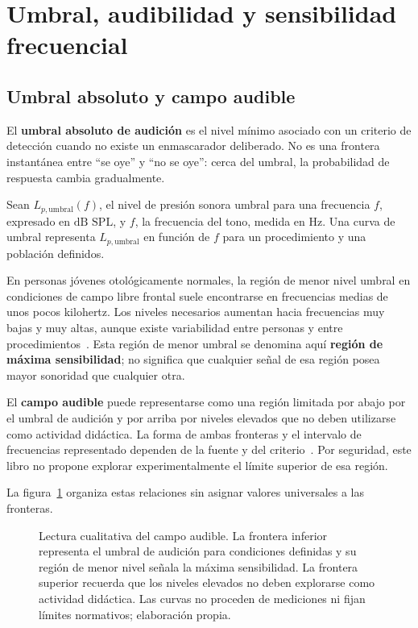 \section{Umbral, audibilidad y sensibilidad frecuencial}
\label{sec:u7-umbral-audibilidad}

\subsection{Umbral absoluto y campo audible}
\label{sec:u7-umbral-absoluto}

El \textbf{umbral absoluto de audición} es el nivel mínimo asociado con un
criterio de detección cuando no existe un enmascarador deliberado. No es una
frontera instantánea entre ``se oye'' y ``no se oye'': cerca del umbral, la
probabilidad de respuesta cambia gradualmente.

Sean \(L_{p,\mathrm{umbral}}(f)\), el nivel de presión sonora umbral para una
frecuencia \(f\), expresado en \(\text{dB SPL}\), y \(f\), la frecuencia del
tono, medida en \(\text{Hz}\). Una curva de umbral representa
\(L_{p,\mathrm{umbral}}\) en función de \(f\) para un procedimiento y una
población definidos.

En personas jóvenes otológicamente normales, la región de menor nivel
umbral en condiciones de campo libre frontal suele encontrarse en frecuencias
medias de unos pocos kilohertz. Los niveles necesarios aumentan hacia
frecuencias muy bajas y muy altas, aunque existe variabilidad entre personas y
entre procedimientos~\cite{iso226_2023,oxenham2018}. Esta región de menor umbral se denomina aquí
\textbf{región de máxima sensibilidad}; no significa que cualquier señal de
esa región posea mayor sonoridad que cualquier otra.

El \textbf{campo audible} puede representarse como una región limitada por
abajo por el umbral de audición y por arriba por niveles elevados que no deben
utilizarse como actividad didáctica. La forma de ambas fronteras y el
intervalo de frecuencias representado dependen de la fuente y del criterio~\cite{iso226_2023,oxenham2018}.
Por seguridad, este libro no propone explorar experimentalmente el límite
superior de esa región.

La figura~\ref{fig:u7-umbral-campo-audible} organiza estas relaciones sin
asignar valores universales a las fronteras.

\begin{figure}[htbp]
    \centering
    
    \caption{Lectura cualitativa del campo audible. La frontera inferior
    representa el umbral de audición para condiciones definidas y su región de
    menor nivel señala la máxima sensibilidad. La frontera superior recuerda
    que los niveles elevados no deben explorarse como actividad didáctica. Las
    curvas no proceden de mediciones ni fijan límites normativos; elaboración
    propia.}
    \label{fig:u7-umbral-campo-audible}
\end{figure}

